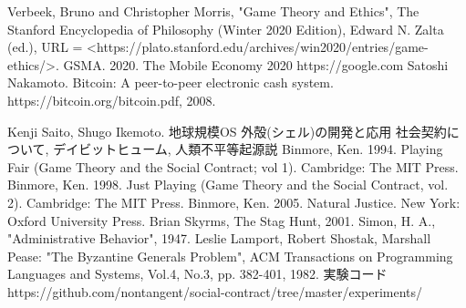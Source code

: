 \documentclass[a4j]{ujreport}
\begin{document}
\begin{thebibliography}{数字}
   Verbeek, Bruno and Christopher Morris, "Game Theory and Ethics", The Stanford Encyclopedia of Philosophy (Winter 2020 Edition), Edward N. Zalta (ed.), URL = <https://plato.stanford.edu/archives/win2020/entries/game-ethics/>.
   GSMA. 2020. The Mobile Economy 2020
   https://google.com
   Satoshi Nakamoto. Bitcoin: A peer-to-peer electronic cash system. https://bitcoin.org/bitcoin.pdf, 2008.

   Kenji Saito, Shugo Ikemoto. 地球規模OS 外殻(シェル)の開発と応用 
   社会契約について, デイビットヒューム,
   人類不平等起源説
   Binmore, Ken. 1994. Playing Fair (Game Theory and the Social Contract; vol 1). Cambridge: The MIT Press.
   Binmore, Ken. 1998. Just Playing (Game Theory and the Social Contract, vol. 2). Cambridge: The MIT Press.
   Binmore, Ken. 2005. Natural Justice. New York: Oxford University Press.
   Brian Skyrms, The Stag Hunt, 2001.
   Simon, H. A., "Administrative Behavior", 1947.
   Leslie Lamport, Robert Shostak, Marshall Pease: "The Byzantine Generals Problem", ACM Transactions on Programming Languages and Systems, Vol.4, No.3, pp. 382-401, 1982.
   実験コード https://github.com/nontangent/social-contract/tree/master/experiments/
\end{thebibliography}
\end{document}
